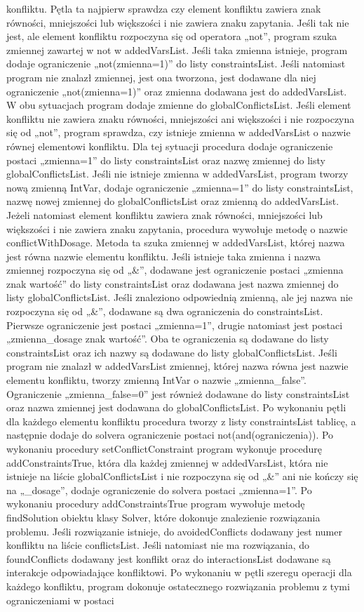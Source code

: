 \documentclass[oneside,a4paper]{book}
\begin{document}
\begin{spacing}{1.5}
konfliktu. Pętla ta najpierw sprawdza czy element konfliktu zawiera znak równości, mniejszości lub większości i nie zawiera znaku zapytania. Jeśli tak nie jest, ale element konfliktu rozpoczyna się od operatora „not”, program szuka zmiennej zawartej w not w addedVarsList. Jeśli taka zmienna istnieje, program dodaje ograniczenie „not(zmienna=1)” do listy constraintsList. Jeśli natomiast program nie znalazł zmiennej, jest ona tworzona, jest dodawane dla niej ograniczenie „not(zmienna=1)” oraz zmienna dodawana jest do addedVarsList. W obu sytuacjach program dodaje zmienne do globalConflictsList. Jeśli element konfliktu nie zawiera znaku równości, mniejszości ani większości i nie rozpoczyna się od „not”, program sprawdza, czy istnieje zmienna w addedVarsList o nazwie równej elementowi konfliktu. Dla tej sytuacji procedura dodaje ograniczenie postaci „zmienna=1” do listy constraintsList oraz nazwę zmiennej do listy globalConflictsList. Jeśli nie istnieje zmienna w addedVarsList, program tworzy nową zmienną IntVar, dodaje ograniczenie „zmienna=1” do listy constraintsList, nazwę nowej zmiennej do globalConflictsList oraz zmienną do addedVarsList. Jeżeli natomiast element konfliktu zawiera znak równości, mniejszości lub większości i nie zawiera znaku zapytania, procedura wywołuje metodę o nazwie conflictWithDosage. Metoda ta szuka zmiennej w addedVarsList, której nazwa jest równa nazwie elementu konfliktu. Jeśli istnieje taka zmienna i nazwa zmiennej rozpoczyna się od „\&”, dodawane jest ograniczenie postaci „zmienna znak wartość” do listy constraintsList oraz dodawana jest nazwa zmiennej do listy globalConflictsList. Jeśli znaleziono odpowiednią zmienną, ale jej nazwa nie rozpoczyna się od „\&”, dodawane są dwa ograniczenia do constraintsList. Pierwsze ograniczenie jest postaci „zmienna=1”, drugie natomiast jest postaci „zmienna\_dosage znak wartość”. Oba te ograniczenia są dodawane do listy constraintsList oraz ich nazwy są dodawane do listy globalConflictsList. Jeśli program nie znalazł w addedVarsList zmiennej, której nazwa równa jest nazwie elementu konfliktu,  tworzy zmienną IntVar o nazwie „zmienna\_false”. Ograniczenie „zmienna\_false=0” jest również dodawane do listy constraintsList oraz nazwa zmiennej jest dodawana do globalConflictsList. Po wykonaniu pętli dla każdego elementu konfliktu procedura tworzy z listy constraintsList tablicę, a następnie dodaje do solvera ograniczenie postaci not(and(ograniczenia)). Po wykonaniu procedury setConflictConstraint program wykonuje procedurę addConstraintsTrue, która dla każdej zmiennej w addedVarsList, która nie istnieje na liście globalConflictsList i nie rozpoczyna się od „\&” ani nie kończy się na „\_dosage”, dodaje ograniczenie do solvera postaci „zmienna=1”. Po wykonaniu procedury addConstraintsTrue program wywołuje metodę findSolution obiektu klasy Solver, które dokonuje znalezienie rozwiązania problemu. Jeśli rozwiązanie istnieje, do avoidedConflicts dodawany jest numer konfliktu na liście conflictsList. Jeśli natomiast nie ma rozwiązania, do foundConflicts dodawany jest konflikt oraz do interactionsList dodawane są interakcje odpowiadające konfliktowi. Po wykonaniu w pętli szeregu operacji dla każdego konfliktu, program dokonuje ostatecznego rozwiązania problemu z tymi ograniczeniami w postaci 
\end{spacing}
\end{document}
